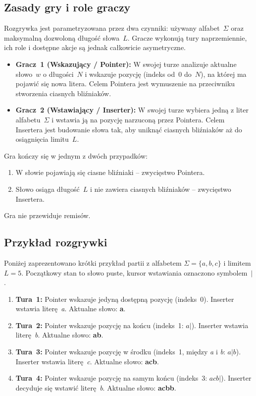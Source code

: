 \documentclass{article}
\begin{document}
\subsection{Zasady gry i role graczy}
Rozgrywka jest parametryzowana przez dwa czynniki: używany alfabet~$\Sigma$
oraz maksymalną dozwoloną długość słowa~$L$. Gracze wykonują tury
naprzemiennie, ich role i dostępne akcje są jednak całkowicie asymetryczne.

\begin{itemize}
    \item \textbf{Gracz~1 (Wskazujący / Pointer):} W swojej turze analizuje
    aktualne słowo~$w$ o długości~$N$ i wskazuje pozycję (indeks od~$0$
    do~$N$), na której ma pojawić się nowa litera. Celem Pointera jest
    wymuszenie na przeciwniku stworzenia ciasnych bliźniaków.
    \item \textbf{Gracz~2 (Wstawiający / Inserter):} W swojej turze wybiera
    jedną z liter alfabetu~$\Sigma$ i wstawia ją na pozycję narzuconą przez
    Pointera. Celem Insertera jest budowanie słowa tak, aby uniknąć
    ciasnych bliźniaków aż do osiągnięcia limitu~$L$.
\end{itemize}

Gra kończy się w jednym z dwóch przypadków:
\begin{enumerate}
    \item W słowie pojawiają się ciasne bliźniaki -- zwycięstwo Pointera.
    \item Słowo osiąga długość~$L$ i nie zawiera ciasnych bliźniaków --
    zwycięstwo Insertera.
\end{enumerate}
Gra nie przewiduje remisów.

\subsection{Przykład rozgrywki}
Poniżej zaprezentowano krótki przykład partii z alfabetem
$\Sigma=\{a,b,c\}$ i limitem $L=5$. Początkowy stan to słowo puste,
kursor wstawiania oznaczono symbolem~$|$.

\begin{enumerate}
    \item \textbf{Tura~1:} Pointer wskazuje jedyną dostępną pozycję
    (indeks~0). Inserter wstawia literę~\textit{a}. Aktualne słowo:
    \textbf{a}.
    \item \textbf{Tura~2:} Pointer wskazuje pozycję na końcu (indeks~1:
    $a|$). Inserter wstawia literę~\textit{b}. Aktualne słowo: \textbf{ab}.
    \item \textbf{Tura~3:} Pointer wskazuje pozycję w środku (indeks~1,
    między \textit{a} i \textit{b}: $a|b$). Inserter wstawia
    literę~\textit{c}. Aktualne słowo: \textbf{acb}.
    \item \textbf{Tura~4:} Pointer wskazuje pozycję na samym końcu (indeks~3:
    $acb|$). Inserter decyduje się wstawić literę~\textit{b}. Aktualne
    słowo: \textbf{acbb}.
\end{enumerate}
\end{document}
